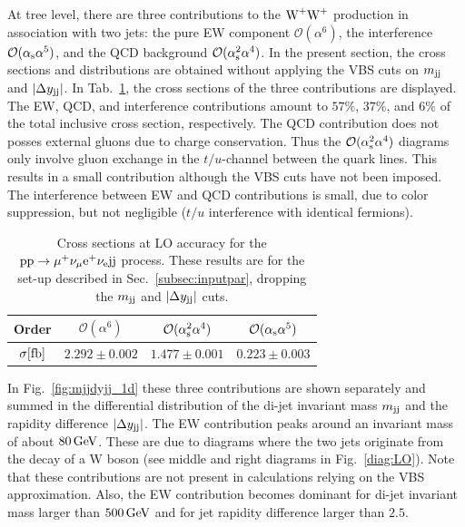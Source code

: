 At tree level, there are three contributions to the $\text{W}^+\text{W}^+$ production in association with two jets: the pure EW component $\mathcal{O}(\alpha^6)$, the interference $\mathcal{O}(\alpha_\text{s}\alpha^5)$, and the QCD background $\mathcal{O}(\alpha_\text{s}^2\alpha^4)$.
In the present section, the cross sections and distributions are obtained without applying the VBS cuts on $m_{\text{j}\text{j}}$ and $|\Delta y_{\text{j}\text{j}}|$.
In Tab.~\ref{tab:LOscanXsec}, the cross sections of the three contributions are displayed.
The EW, QCD, and interference contributions amount to $57\%$, $37\%$, and $6\%$ of the total inclusive cross section, respectively.
The QCD contribution does not posses external gluons due to charge conservation.
Thus the $\mathcal{O}(\alpha_\text{s}^2\alpha^4)$ diagrams only involve gluon exchange in the $t/u$-channel between the quark lines.
This results in a small contribution although the VBS cuts have not been imposed.
The interference between EW and QCD contributions is small, due to color suppression, but not negligible ($t/u$ interference with identical fermions).

\begin{table}[h!]
    \centering
    \begin{tabular}{c|c|c|c}
        Order & $\mathcal{O}(\alpha^6)$ & $\mathcal{O}(\alpha_\text{s}^2\alpha^4)$ & $\mathcal{O}(\alpha_\text{s}\alpha^5)$ \\
        \hline
        \hline
        $\sigma[\rm{fb}]$ & $ 2.292 \pm 0.002 $ & $ 1.477 \pm 0.001 $ & $ 0.223 \pm 0.003 $ \\
    \end{tabular}
    \caption{\label{tab:LOscanXsec} Cross sections at LO accuracy for the ${\rm p}{\rm p}\to\mu^+\nu_\mu{\rm e}^+\nu_{\rm e}{\rm j}{\rm j}$ process.
    These results are for the set-up described in Sec.~\ref{subsec:inputpar}, dropping the $m_{\text{j}\text{j}}$ and $|\Delta y_{\text{j}\text{j}}|$ cuts.}
\end{table}

In Fig.~\ref{fig:mjjdyjj_1d} these three contributions are shown separately and summed in the differential distribution of the di-jet invariant mass $m_{\text{j}\text{j}}$ and the rapidity difference $|\Delta y_{\text{j}\text{j}}|$.
The EW contribution peaks around an invariant mass of about $80\,\text{GeV}$.
These are due to diagrams where the two jets originate from the decay of a W boson (see middle and right diagrams in Fig.~\ref{diag:LO}).
Note that these contributions are not present in calculations relying on the VBS approximation.
Also, the EW contribution becomes dominant for di-jet invariant mass larger than $500\,\text{GeV}$ and for jet rapidity difference larger than $2.5$.

